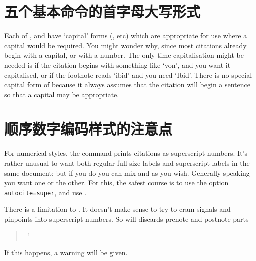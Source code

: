 \section{五个基本命令的首字母大写形式}

 Each of ,
 and  have `capital' forms (, etc)
which are appropriate for use where a capital would be required. You
might wonder why, since most citations already begin with a capital,
or with a number. The only time capitalisation might be needed is if
the citation begins with something like `von', and you want it
capitalised, or if the footnote reads `ibid' and you need
`Ibid'. There is no special capital form of  because it
always assumes that the citation will begin a sentence so that a
capital may be appropriate.  

\section{顺序数字编码样式的注意点}

For numerical styles, the command  prints citations as
superscript numbers. It’s rather unusual to want both regular
full-size labels and superscript labels in the same document; but if
you do you can mix  and  as you wish. 
Generally
speaking you want one or the other. For this, the safest course is to
use the option \texttt{autocite=super}, and use .

There is a limitation to . It doesn't make sense to try
to cram signals and pinpoints into superscript numbers. So
 will discards prenote and postnote parts
\begin{quote}
 \gives\ $^1$
\end{quote}
If this happens, a warning will be given.


